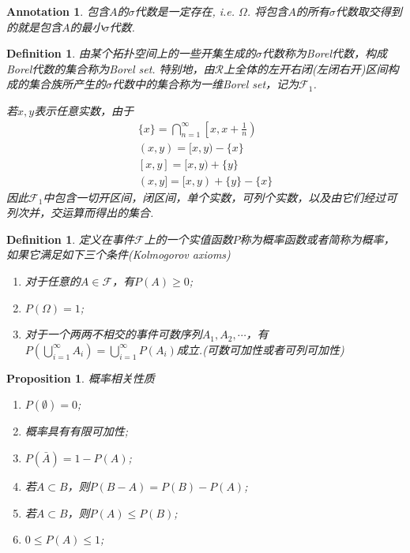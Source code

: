 \documentclass{article}
\newtheorem{proposition}[theorem]{Proposition}
\newtheorem{definition}[theorem]{Definition}
\newtheorem{annotation}[theorem]{Annotation}
\begin{document}
\begin{annotation}
\rm 包含$A$的$\sigma$代数是一定存在, i.e. $\Omega$. 将包含$A$的所有$\sigma$代数取交得到的就是包含$A$的最小$\sigma$代数. 
\end{annotation}

\begin{definition}
\rm 由某个拓扑空间上的一些开集生成的$\sigma$代数称为Borel代数，构成Borel代数的集合称为{\color{red}Borel set}. 特别地，由$\mathcal{R}$上全体的左开右闭(左闭右开)区间构成的集合族所产生的$\sigma$代数中的集合称为一维Borel set，记为$\mathscr{F}_1$. 

若$x,y$表示任意实数，由于
$$
\begin{array}{ll}
\{x\} =\bigcap\limits_{n=1}^{\infty}\left[x,x+\frac{1}{n}\right) \\
(x,y) = [x,y) - \{x\} \\
\left[x,y\right] = [x,y) + \{y\} \\
(x,y] = [x,y) + \{y\} - \{x\}
\end{array}
$$
因此$\mathscr{F}_1$中包含一切开区间，闭区间，单个实数，可列个实数，以及由它们经过可列次并，交运算而得出的集合. 
\end{definition}

\begin{definition}
\rm 定义在事件$\mathscr{F}$上的一个实值函数$P$称为{\color{red}概率函数}或者简称为概率，如果它满足如下三个条件(Kolmogorov axioms)
\begin{enumerate}
	\item 对于任意的$A \in \mathscr{F}$，有$P(A) \geq 0$;
	\item $P(\Omega) = 1$;
	\item 对于一个两两不相交的事件可数序列$A_1,A_2,\cdots$，有$P(\bigcup\limits_{i=1}^{\infty} A_i) = \bigcup\limits_{i=1}^{\infty}P(A_i)$成立.({\color{red}可数可加性或者可列可加性})
\end{enumerate}
\end{definition}


\begin{proposition}
\rm {\color{red}概率相关性质}
\begin{enumerate}
	\item $P(\emptyset) = 0$;
	\item 概率具有有限可加性;
	\item $P(\bar{A}) = 1 - P(A)$;
	\item 若$A \subset B$，则$P(B-A) = P(B) - P(A)$;
	\item 若$A\subset B$，则$P(A) \leq P(B)$;
	\item $0 \leq P(A) \leq 1$;
\end{enumerate}
\end{proposition}
\end{document}
